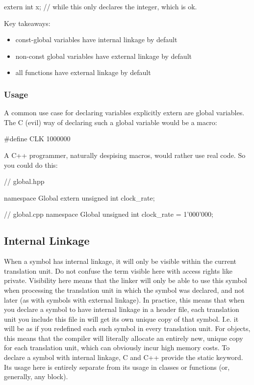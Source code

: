 \documentclass{report}
\begin{document}
\begin{concept}
\begin{cppcode}
        extern int x;   // while this only declares the integer, which is ok.
    \end{cppcode}
    \bigbreak \noindent 
    Key takeaways:
    \begin{itemize}
        \item const-global variables have internal linkage by default
        \item non-const global variables have external linkage by default
        \item all functions have external linkage by default
    \end{itemize}

    \bigbreak \noindent 
    \subsubsection{Usage}
    \bigbreak \noindent 
    A common use case for declaring variables explicitly extern are global variables. The C (evil) way of declaring such a global variable would be a macro:
    \bigbreak \noindent 
    \begin{cppcode}
    #define CLK 1000000
    \end{cppcode}
    \bigbreak \noindent 
     A C++ programmer, naturally despising macros, would rather use real code. So you could do this:
    \begin{cppcode}
        // global.hpp

        namespace Global
        {
            extern unsigned int clock_rate;
        }

        // global.cpp
        namespace Global
        {
            unsigned int clock_rate = 1'000'000;
        }
    \end{cppcode}

    \bigbreak \noindent 
    \subsection{Internal Linkage}
    \bigbreak \noindent 
    When a symbol has internal linkage, it will only be visible within the current translation unit. Do not confuse the term visible here with access rights like private. Visibility here means that the linker will only be able to use this symbol when processing the translation unit in which the symbol was declared, and not later (as with symbols with external linkage). In practice, this means that when you declare a symbol to have internal linkage in a header file, each translation unit you include this file in will get its own unique copy of that symbol. I.e. it will be as if you redefined each such symbol in every translation unit. For objects, this means that the compiler will literally allocate an entirely new, unique copy for each translation unit, which can obviously incur high memory costs.
    \bigbreak \noindent 
    To declare a symbol with internal linkage, C and C++ provide the static keyword. Its usage here is entirely separate from its usage in classes or functions (or, generally, any block).
    \bigbreak \noindent 

\end{concept}
\end{document}
